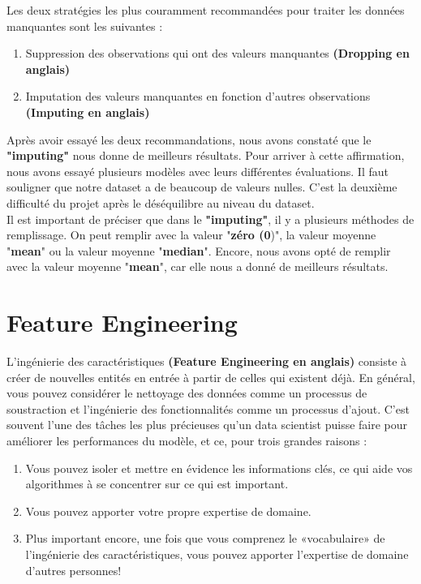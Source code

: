 \documentclass[12pt, french]{report}
\begin{document}
Les deux stratégies les plus couramment recommandées pour traiter les données manquantes sont les suivantes \cite{key21}:
\begin{enumerate}
\item Suppression des observations qui ont des valeurs manquantes \textbf{(Dropping en anglais)}
\item Imputation des valeurs manquantes en fonction d'autres observations \textbf{(Imputing en anglais)}
\end{enumerate}

Après avoir essayé les deux recommandations, nous avons constaté que le \textbf{"imputing"} nous donne de meilleurs résultats. Pour arriver à cette affirmation, nous avons essayé plusieurs modèles avec leurs différentes évaluations. Il faut souligner que notre dataset a de beaucoup de valeurs nulles. C'est la deuxième difficulté du projet après le déséquilibre au niveau du dataset. \\

Il est important de préciser que dans le  \textbf{"imputing"}, il y a plusieurs méthodes de remplissage. On peut remplir avec la valeur "\textbf{zéro (0})", la valeur moyenne "\textbf{mean}" ou la valeur moyenne "\textbf{median}". Encore, nous avons opté de remplir avec la valeur moyenne "\textbf{mean}", car elle nous a donné de meilleurs résultats. 


\section{Feature Engineering}

L'ingénierie des caractéristiques \textbf{(Feature Engineering en anglais)} consiste à créer de nouvelles entités en entrée à partir de celles qui existent déjà. En général, vous pouvez considérer le nettoyage des données comme un processus de soustraction et l'ingénierie des fonctionnalités comme un processus d'ajout. C'est souvent l'une des tâches les plus précieuses qu'un data scientist puisse faire pour améliorer les performances du modèle, et ce, pour trois grandes raisons \cite{key22}:

\begin{enumerate}
\item Vous pouvez isoler et mettre en évidence les informations clés, ce qui aide vos algorithmes à se concentrer sur ce qui est important.
\item Vous pouvez apporter votre propre expertise de domaine.
\item Plus important encore, une fois que vous comprenez le «vocabulaire» de l'ingénierie des caractéristiques, vous pouvez apporter l'expertise de domaine d'autres personnes!
\end{enumerate}
\end{document}
